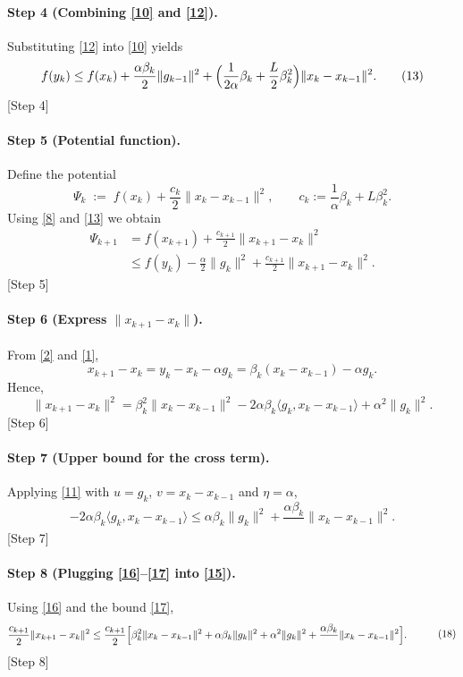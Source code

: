 \documentclass{article}
\begin{document}
\paragraph{Step 4 (Combining \eqref{10} and \eqref{12}).}
Substituting \eqref{12} into \eqref{10} yields
\[
f(y_k)\le f(x_k)
   +\frac{\alpha\beta_k}{2}\|g_{k-1}\|^2
   +\Bigl(\frac{1}{2\alpha}\beta_k+\frac{L}{2}\beta_k^{2}\Bigr)\|x_k-x_{k-1}\|^2 .
\tag{13}
\]
\hfill[Step 4]

\paragraph{Step 5 (Potential function).}
Define the potential
\[
\Psi_k \;:=\; f(x_k) + \frac{c_k}{2}\|x_k-x_{k-1}\|^2 ,
\qquad c_k :=\frac{1}{\alpha}\beta_k+\!L\beta_k^{2}.
\tag{14}
\]
Using \eqref{8} and \eqref{13} we obtain
\[
\begin{aligned}
\Psi_{k+1}
&= f(x_{k+1})+\frac{c_{k+1}}{2}\|x_{k+1}-x_k\|^2 \\
&\le f(y_k)-\frac{\alpha}{2}\|g_k\|^2
   +\frac{c_{k+1}}{2}\|x_{k+1}-x_k\|^2 .
\end{aligned}
\tag{15}
\]
\hfill[Step 5]

\paragraph{Step 6 (Express $\|x_{k+1}-x_k\|$).}
From \eqref{2} and \eqref{1},
\[
x_{k+1}-x_k = y_k-x_k-\alpha g_k
            = \beta_k (x_k-x_{k-1})-\alpha g_k .
\]
Hence,
\[
\|x_{k+1}-x_k\|^2
= \beta_k^{2}\|x_k-x_{k-1}\|^2
  -2\alpha\beta_k\langle g_k,x_k-x_{k-1}\rangle
  +\alpha^{2}\|g_k\|^2 .
\tag{16}
\]
\hfill[Step 6]

\paragraph{Step 7 (Upper bound for the cross term).}
Applying \eqref{11} with $u=g_k$, $v=x_k-x_{k-1}$ and $\eta=\alpha$,
\[
-2\alpha\beta_k\langle g_k,x_k-x_{k-1}\rangle
\le \alpha\beta_k\|g_k\|^2+\frac{\alpha\beta_k}{\!}\|x_k-x_{k-1}\|^2 .
\tag{17}
\]
\hfill[Step 7]

\paragraph{Step 8 (Plugging \eqref{16}–\eqref{17} into \eqref{15}).}
Using \eqref{16} and the bound \eqref{17},
\[
\begin{aligned}
\frac{c_{k+1}}{2}\|x_{k+1}-x_k\|^2
&\le \frac{c_{k+1}}{2}\Bigl[
      \beta_k^{2}\|x_k-x_{k-1}\|^2
      +\alpha\beta_k\|g_k\|^2
      +\alpha^{2}\|g_k\|^2
      +\frac{\alpha\beta_k}{\!}\|x_k-x_{k-1}\|^2
      \Bigr] .
\end{aligned}
\tag{18}
\]
\hfill[Step 8]
\end{document}
